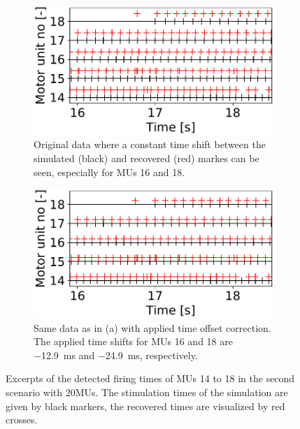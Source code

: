\begin{figure}
  \centering%
  \begin{subfigure}[t]{0.47\textwidth}%
    \centering%
    \includegraphics[width=\textwidth]{images/results/application/emg_20mus-40s_new-noshift2.pdf}%
    \caption{Original data where a constant time shift between the simulated (black) and recovered (red) markes can be seen, especially for MUs 16 and 18.}%
    \label{fig:newmus_nocorrection}%
  \end{subfigure}
  \hfill
  \begin{subfigure}[t]{0.47\textwidth}%
    \centering%
    \includegraphics[width=\textwidth]{images/results/application/emg_20mus-40s_new-shift2.pdf}%
    \caption{Same data as in (a) with applied time offset correction. The applied time shifts for MUs 16 and 18 are \SI{-12.9}{\ms} and \SI{-24.9}{\ms}, respectively.}%
    \label{fig:newmus_withcorrection}%
  \end{subfigure}
  \caption{Excerpts of the detected firing times of MUs 14 to 18 in the second scenario with 20MUs. The stimulation times of the simulation are given by black markers, the recovered times are visualized by red crosses.}%
  \label{fig:newmus_shifting}%
\end{figure}


